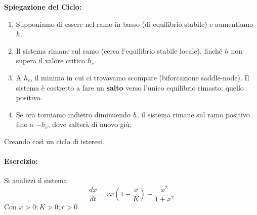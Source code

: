 \documentclass[openany]{book}
\theoremstyle{definition}
\theoremstyle{remark}
\begin{document}
\begin{center}
\end{center}

\textbf{Spiegazione del Ciclo:}
\begin{enumerate}
    \item Supponiamo di essere nel ramo in basso (di equilibrio stabile) e aumentiamo  $h$.
    \item  Il sistema rimane sul ramo (cerca l'equilibrio stabile locale), finché $h$ non supera il valore critico $h_c$.
    \item A $h_c$, il minimo in cui ci trovavamo scompare (biforcazione saddle-node). Il sistema è costretto a fare un \textbf{salto} verso l'unico equilibrio rimasto: quello positivo.
    \item Se ora torniamo indietro diminuendo $h$, il sistema rimane sul ramo positivo fino a $-h_c$, dove salterà di nuovo giù.
\end{enumerate}
Creando così un ciclo di isteresi.

\paragraph{Esercizio:}
Si analizzi il sistema:
\[ \frac{dx}{dt} = rx \left( 1 - \frac{x}{K} \right) - \frac{x^2}{1+x^2} \]
Con $x>0; K>0; r>0$
\end{document}
